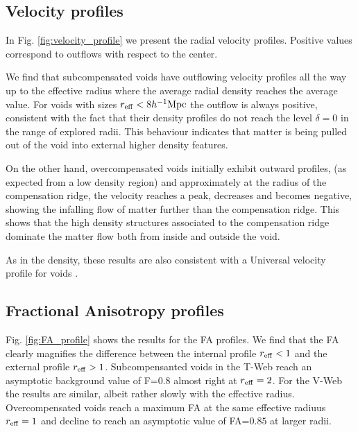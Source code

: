 \documentclass[a4,useAMS,usenatbib,usegraphicx]{mn2e}
\newcommand{\hMpc}{{\ifmmode{h^{-1}{\rm Mpc}}\else{$h^{-1}$Mpc}\fi}}
\begin{document}
\subsection{Velocity profiles}
\label{subsec:velocity_voids}

In Fig. \ref{fig:velocity_profile} we present the radial velocity
profiles. 
Positive values correspond to outflows with respect to the center. 

We find that subcompensated voids have outflowing velocity profiles
all the way up to the effective radius where the average radial
density reaches the average value.
For voids with sizes $r_{\rm eff}<8\hMpc$ the outflow is always
positive, consistent with the fact that their density profiles do not
reach the level $\delta=0$ in the range of explored radii.
This behaviour indicates that matter is being pulled out of the void
into external higher density features.


On the other hand, overcompensated voids initially exhibit outward
profiles, (as expected from a low density region) and approximately at
the radius of the compensation ridge, the velocity reaches a peak,
decreases and becomes negative, showing the infalling flow of matter
further than the compensation ridge. 
This shows that the high density structures associated to the
compensation ridge dominate the matter flow both from inside and
outside the void.

As in the density, these results are also consistent with a Universal
velocity profile for voids \citep{Paz13, Hamaus14}.

\subsection{Fractional Anisotropy profiles}
\label{subsec:FA_voids}



Fig. \ref{fig:FA_profile} shows the results for the FA profiles.
We find that the FA clearly magnifies the difference between the
internal profile $r_{\rm eff}<1$ and the external profile $r_{\rm
  eff}>1$. 
Subcompensanted voids in the T-Web reach an asymptotic background
value of F=$0.8$ almost right at $r_{\rm eff}=2$. 
For the V-Web the results are similar, albeit rather slowly with the
effective radius.
Overcompensated voids reach a maximum FA at the same effective radiuus
$r_{\rm eff}=1$ and decline to reach an asymptotic value of FA=$0.85$
at larger radii.
\end{document}
